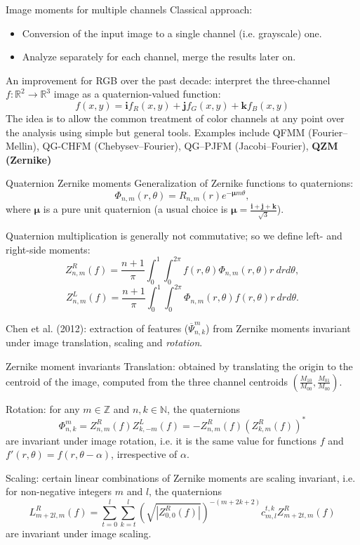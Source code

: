\documentclass{beamer}
\newcommand{\N}{\mathbb{N}}
\newcommand{\Z}{\mathbb{Z}}
\newcommand{\R}{\mathbb{R}}
\newcommand{\qi}{\textbf{i}}
\newcommand{\qj}{\textbf{j}}
\newcommand{\qk}{\textbf{k}}
\newcommand{\qmu}{\boldsymbol{\mu}}
\def\N{{\mathbb N}}
\def\R{{\mathbb R}}
\def\Z{{\mathbb Z}}
\begin{document}
\begin{frame}{Image moments for multiple channels}
\vskip 3mm
Classical approach:
\begin{itemize}
    \item Conversion of the input image to a single channel (i.e. grayscale) one.
    \item Analyze separately for each channel, merge the results later on.
\end{itemize}
An improvement for RGB over the past decade: interpret the three-channel $f : \R^2 \rightarrow \R^3$ image as a quaternion-valued function:
$$f(x,y) = \qi f_R(x,y) + \qj f_G(x,y) + \qk f_B(x,y)$$
The idea is to allow the common treatment of color channels at any point over the analysis using simple but general tools.
Examples include QFMM (Fourier--Mellin), QG-CHFM (Chebysev--Fourier), QG--PJFM (Jacobi--Fourier), \textbf{QZM (Zernike)}
\end{frame}


\begin{frame}{Quaternion Zernike moments}
\vskip 3mm
Generalization of Zernike functions to quaternions: $$\Phi_{n,m}(r,\theta) = R_{n,m}(r)e^{-\qmu m \theta},$$ where $\qmu$ is a pure unit quaternion (a usual choice is $\qmu = \frac{\qi + \qj + \qk}{\sqrt{3}}$).

Quaternion multiplication is generally not commutative; so we define left- and right-side moments:
$$Z^R_{n,m}(f) = \frac{n+1}{\pi}\int_0^1\int_0^{2\pi}f(r,\theta)\Phi_{n,m}(r,\theta)r\ dr d\theta,$$
$$Z^L_{n,m}(f) = \frac{n+1}{\pi}\int_0^1\int_0^{2\pi}\Phi_{n,m}(r,\theta)f(r,\theta)r\ dr d\theta.$$

Chen et al. (2012): extraction of features ($\overline{\Psi}_{n,k}^m$) from Zernike moments invariant under image translation, scaling and \emph{rotation}. 
\end{frame}

\begin{frame}{Zernike moment invariants}
\vskip 3mm
Translation: obtained by translating the origin to the centroid of the image, computed from the three channel centroids $\left(\frac{M_{10}}{M_{00}},\frac{M_{01}}{M_{00}}\right)$.

Rotation: for any $m\in\Z$ and $n,k\in\N$, the quaternions $$\Phi_{n,k}^m = Z_{n,m}^R(f)Z_{k,-m}^L(f) = -Z_{n,m}^R(f)(Z_{k,m}^R(f))^*$$ are invariant under image rotation, i.e. it is the same value for functions $f$ and $f'(r,\theta) = f(r, \theta - \alpha)$, irrespective of $\alpha$.

Scaling: certain linear combinations of Zernike moments are scaling invariant, i.e. for non-negative integers $m$ and $l$, the quaternions $$L_{m + 2l,m}^R(f) = \sum_{t=0}^l\sum_{k=t}^l\left(\sqrt{|Z_{0,0}^R(f)|}\right)^{-(m+2k+2)}c_{m,l}^{t,k}Z_{m+2t,m}^R(f)$$ are invariant under image scaling.
\end{frame}
\end{document}
